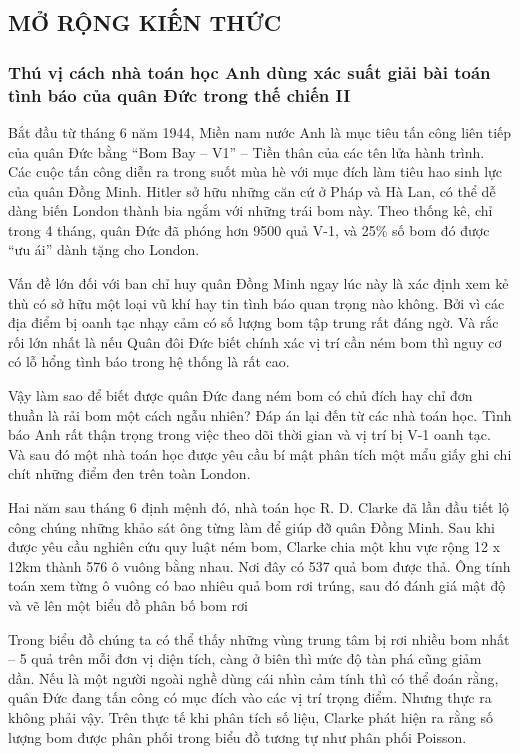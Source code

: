 \subsection{MỞ RỘNG KIẾN THỨC}
\subsubsection*{Thú vị cách nhà toán học Anh dùng xác suất giải bài toán tình báo của quân Đức trong thế chiến II}
Bắt đầu từ tháng 6 năm 1944, Miền nam nước Anh là mục tiêu tấn công liên tiếp của quân Đức bằng “Bom Bay – V1” – Tiền thân của các tên lửa hành trình. Các cuộc tấn công diễn ra trong suốt mùa hè với mục đích làm tiêu hao sinh lực của quân Đồng Minh. Hitler sở hữu những căn cứ ở Pháp và Hà Lan, có thể dễ dàng biến London thành bia ngắm với những trái bom này. Theo thống kê, chỉ trong 4 tháng, quân Đức đã phóng hơn 9500 quả V-1, và 25\% số bom đó được “ưu ái” dành tặng cho London.

Vấn đề lớn đối với ban chỉ huy quân Đồng Minh ngay lúc này là xác định xem kẻ thù có sở hữu một loại vũ khí hay tin tình báo quan trọng nào không. Bởi vì các địa điểm bị oanh tạc nhạy cảm có số lượng bom tập trung rất đáng ngờ. Và rắc rối lớn nhất là nếu Quân đôi Đức biết chính xác vị trí cần ném bom thì nguy cơ có lỗ hổng tình báo trong hệ thống là rất cao.

Vậy làm sao để biết được quân Đức đang ném bom có chủ đích hay chỉ đơn thuần là rải bom một cách ngẫu nhiên? Đáp án lại đến từ các nhà toán học. Tình báo Anh rất thận trọng trong việc theo dõi thời gian và vị trí bị V-1 oanh tạc. Và sau đó một nhà toán học được yêu cầu bí mật phân tích một mẩu giấy ghi chi chít những điểm đen trên toàn London.

Hai năm sau tháng 6 định mệnh đó, nhà toán học  R. D. Clarke đã lần đầu tiết lộ công chúng những khảo sát ông từng làm để giúp đỡ quân Đồng Minh. Sau khi được yêu cầu nghiên cứu quy luật ném bom, Clarke chia một khu vực rộng 12 x 12km  thành 576 ô vuông bằng nhau. Nơi đây có 537 quả bom được thả. Ông tính toán xem từng ô vuông có bao nhiêu quả bom rơi trúng, sau đó đánh giá mật độ và vẽ lên một biểu đồ phân bố bom rơi

Trong biểu đồ chúng ta có thể thấy những vùng trung tâm bị rơi nhiều bom nhất – 5 quả trên mỗi đơn vị diện tích, càng ở biên thì mức độ tàn phá cũng giảm dần. Nếu là một người ngoài nghề dùng cái nhìn cảm tính thì có thể đoán rằng, quân Đức đang tấn công có mục đích vào các vị trí trọng điểm. Nhưng thực ra không phải vậy. Trên thực tế khi phân tích số liệu, Clarke phát hiện ra rằng số lượng bom được phân phối trong biểu đồ tương tự như phân phối Poisson.

